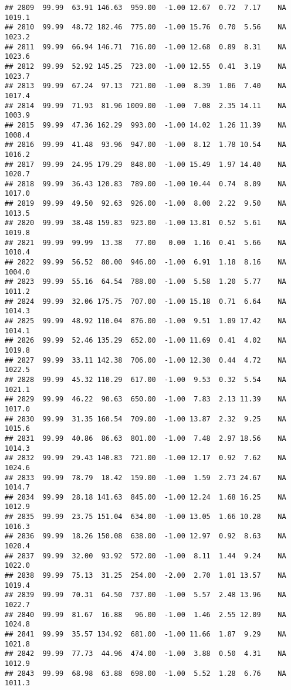 \documentclass{article}\usepackage{graphicx, color}
\makeatletter
\newenvironment{kframe}{%
 \def\at@end@of@kframe{}%
 \ifinner\ifhmode%
  \def\at@end@of@kframe{\end{minipage}}%
  \begin{minipage}{\columnwidth}%
 \fi\fi%
 \def\FrameCommand##1{\hskip\@totalleftmargin \hskip-\fboxsep
 \colorbox{shadecolor}{##1}\hskip-\fboxsep
     \hskip-\linewidth \hskip-\@totalleftmargin \hskip\columnwidth}%
 \MakeFramed {\advance\hsize-\width
   \@totalleftmargin\z@ \linewidth\hsize
   \@setminipage}}%
 {\par\unskip\endMakeFramed%
 \at@end@of@kframe}
\newenvironment{knitrout}{}{} %
\makeatother
\begin{document}
\begin{knitrout}
\begin{kframe}
\begin{verbatim}
## 2809  99.99  63.91 146.63  959.00  -1.00 12.67  0.72  7.17    NA 1019.1
## 2810  99.99  48.72 182.46  775.00  -1.00 15.76  0.70  5.56    NA 1023.2
## 2811  99.99  66.94 146.71  716.00  -1.00 12.68  0.89  8.31    NA 1023.6
## 2812  99.99  52.92 145.25  723.00  -1.00 12.55  0.41  3.19    NA 1023.7
## 2813  99.99  67.24  97.13  721.00  -1.00  8.39  1.06  7.40    NA 1017.4
## 2814  99.99  71.93  81.96 1009.00  -1.00  7.08  2.35 14.11    NA 1003.9
## 2815  99.99  47.36 162.29  993.00  -1.00 14.02  1.26 11.39    NA 1008.4
## 2816  99.99  41.48  93.96  947.00  -1.00  8.12  1.78 10.54    NA 1016.2
## 2817  99.99  24.95 179.29  848.00  -1.00 15.49  1.97 14.40    NA 1020.7
## 2818  99.99  36.43 120.83  789.00  -1.00 10.44  0.74  8.09    NA 1017.0
## 2819  99.99  49.50  92.63  926.00  -1.00  8.00  2.22  9.50    NA 1013.5
## 2820  99.99  38.48 159.83  923.00  -1.00 13.81  0.52  5.61    NA 1019.8
## 2821  99.99  99.99  13.38   77.00   0.00  1.16  0.41  5.66    NA 1010.4
## 2822  99.99  56.52  80.00  946.00  -1.00  6.91  1.18  8.16    NA 1004.0
## 2823  99.99  55.16  64.54  788.00  -1.00  5.58  1.20  5.77    NA 1011.2
## 2824  99.99  32.06 175.75  707.00  -1.00 15.18  0.71  6.64    NA 1014.3
## 2825  99.99  48.92 110.04  876.00  -1.00  9.51  1.09 17.42    NA 1014.1
## 2826  99.99  52.46 135.29  652.00  -1.00 11.69  0.41  4.02    NA 1019.8
## 2827  99.99  33.11 142.38  706.00  -1.00 12.30  0.44  4.72    NA 1022.5
## 2828  99.99  45.32 110.29  617.00  -1.00  9.53  0.32  5.54    NA 1021.1
## 2829  99.99  46.22  90.63  650.00  -1.00  7.83  2.13 11.39    NA 1017.0
## 2830  99.99  31.35 160.54  709.00  -1.00 13.87  2.32  9.25    NA 1015.6
## 2831  99.99  40.86  86.63  801.00  -1.00  7.48  2.97 18.56    NA 1014.3
## 2832  99.99  29.43 140.83  721.00  -1.00 12.17  0.92  7.62    NA 1024.6
## 2833  99.99  78.79  18.42  159.00  -1.00  1.59  2.73 24.67    NA 1014.7
## 2834  99.99  28.18 141.63  845.00  -1.00 12.24  1.68 16.25    NA 1012.9
## 2835  99.99  23.75 151.04  634.00  -1.00 13.05  1.66 10.28    NA 1016.3
## 2836  99.99  18.26 150.08  638.00  -1.00 12.97  0.92  8.63    NA 1020.4
## 2837  99.99  32.00  93.92  572.00  -1.00  8.11  1.44  9.24    NA 1022.0
## 2838  99.99  75.13  31.25  254.00  -2.00  2.70  1.01 13.57    NA 1019.4
## 2839  99.99  70.31  64.50  737.00  -1.00  5.57  2.48 13.96    NA 1022.7
## 2840  99.99  81.67  16.88   96.00  -1.00  1.46  2.55 12.09    NA 1024.8
## 2841  99.99  35.57 134.92  681.00  -1.00 11.66  1.87  9.29    NA 1021.8
## 2842  99.99  77.73  44.96  474.00  -1.00  3.88  0.50  4.31    NA 1012.9
## 2843  99.99  68.98  63.88  698.00  -1.00  5.52  1.28  6.76    NA 1011.3

\end{verbatim}
\end{kframe}
\end{knitrout}
\end{document}
